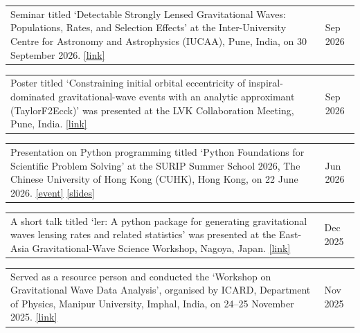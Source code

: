 \documentclass[margin,line]{res}
\begin{document}
\begin{resume}
\begin{tabular}{@{}p{\dimexpr\linewidth-0.62in-3\tabcolsep\relax}p{0.62in}}
Seminar titled `Detectable Strongly Lensed Gravitational Waves: Populations, Rates, and Selection Effects' at the Inter-University Centre for Astronomy and Astrophysics (IUCAA), Pune, India, on 30 September 2026. \href{https://drive.google.com/file/d/1QFgjv86UHZsK1LPOzVCmgzhgrnhrYK_F/view?usp=sharing}{[link]} & \raggedright Sep 2026
\end{tabular}

\begin{tabular}{@{}p{\dimexpr\linewidth-0.62in-3\tabcolsep\relax}p{0.62in}}
\raggedright Poster titled `Constraining initial orbital eccentricity of inspiral-dominated gravitational-wave events with an analytic approximant (TaylorF2Ecck)' was presented at the LVK Collaboration Meeting, Pune, India. \href{https://drive.google.com/file/d/1nNzip_MpmrA39Z2z_0RJVNWrWfgwVObe/view?usp=sharing}{[link]} & \raggedright Sep 2026
\end{tabular}

\begin{tabular}{@{}p{\dimexpr\linewidth-0.62in-3\tabcolsep\relax}p{0.62in}}
Presentation on Python programming titled `Python Foundations for Scientific Problem Solving' at the SURIP Summer School 2026, The Chinese University of Hong Kong (CUHK), Hong Kong, on 22 June 2026. \href{https://gw.phy.cuhk.edu.hk/activities/surip-summer-school-2026/}{[event]} \href{https://drive.google.com/open?id=1tj5ZN51OZFJHG_lgRzO4tUwJHVU5TgdSMo5QUW5XUD8}{[slides]} & \raggedright Jun 2026
\end{tabular}

\begin{tabular}{@{}p{\dimexpr\linewidth-0.62in-3\tabcolsep\relax}p{0.62in}}
A short talk titled `ler: A python package for generating gravitational waves lensing rates and related statistics' was presented at the East-Asia Gravitational-Wave Science Workshop, Nagoya, Japan. \href{https://drive.google.com/file/d/11BcEQ8y3VvyTDxEGSe9ubFNxTURa9zNx/view?usp=sharing}{[link]} & \raggedright Dec 2025
\end{tabular}

\begin{tabular}{@{}p{\dimexpr\linewidth-0.62in-3\tabcolsep\relax}p{0.62in}}
Served as a resource person and conducted the `Workshop on Gravitational Wave Data Analysis', organised by ICARD, Department of Physics, Manipur University, Imphal, India, on 24--25 November 2025. \href{https://drive.google.com/file/d/1RQHuBLzjEc4uYQnRG6v2_5LUdNI1W0b9/view?usp=sharing}{[link]} & \raggedright Nov 2025
\end{tabular}


\end{resume}
\end{document}
